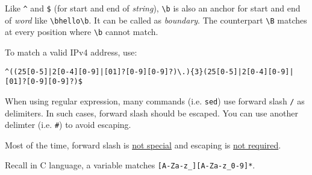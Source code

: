 Like \lstinline|^| and
\lstinline|$| (for start and end of \textit{string}),
\lstinline|\b| is also an anchor for start and end of
\textit{word} like \lstinline|\bhello\b|. It can be called as
\textit{boundary}. The counterpart \lstinline|\B| matches at every
position where \lstinline|\b| cannot match.

To match a valid IPv4 address, use:

\begin{lstlisting}
^((25[0-5]|2[0-4][0-9]|[01]?[0-9][0-9]?)\.){3}(25[0-5]|2[0-4][0-9]|[01]?[0-9][0-9]?)$
\end{lstlisting}

When using regular expression, many commands
(i.e. \lstinline|sed|) use forward slash \verb|/| as
delimiters. In such cases, forward slash should be escaped. You
can use another delimter (i.e. \verb|#|) to avoid escaping.

Most of the time, forward slash is
\href{https://serverfault.com/q/892905}{not special} and escaping
is \href{https://stackoverflow.com/q/6076229}{not required}.

Recall in C language, a variable matches
\lstinline|[A-Za-z_][A-Za-z_0-9]*|.

